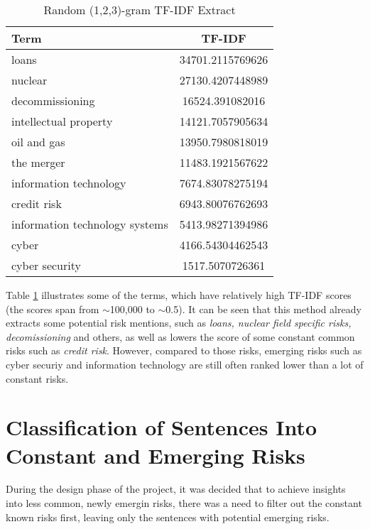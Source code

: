 \begin{table}[H]
\centering
\begin{tabular}{|l|c|}
\hline
Term & TF-IDF \\
\hline
loans & 34701.2115769626\\\hline
nuclear & 27130.4207448989\\\hline
decommissioning & 16524.391082016\\\hline
intellectual property & 14121.7057905634\\\hline
oil and gas & 13950.7980818019\\\hline
the merger & 11483.1921567622\\\hline
information technology & 7674.83078275194\\\hline
credit risk & 6943.80076762693\\\hline
information technology systems & 5413.98271394986\\\hline
cyber & 4166.54304462543\\\hline
cyber security & 1517.5070726361\\\hline
\end{tabular}
\caption{Random (1,2,3)-gram TF-IDF Extract}
\label{table:tfidfall}
\end{table}

Table \ref{table:tfidfall} illustrates some of the terms, which have relatively high TF-IDF scores (the scores span from $\sim$100,000 to $\sim$0.5). It can be seen that this method already extracts some potential risk mentions, such as \textit{loans, nuclear field specific risks, decomissioning} and others, as well as lowers the score of some constant common risks such as \textit{credit risk}. However, compared to those risks, emerging risks such as cyber securiy and information technology are still often ranked lower than a lot of constant risks.

\section{Classification of Sentences Into Constant and Emerging Risks}
\label{sec:classification}
During the design phase of the project, it was decided that to achieve insights into less common, newly emergin risks, there was a need to filter out the constant known risks first, leaving only the sentences with potential emerging risks.


